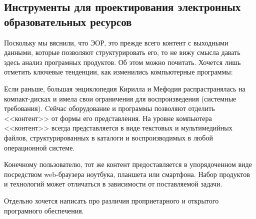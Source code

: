\large
\newpage
\large
\subsection{Инструменты для проектирования электронных образовательных ресурсов}
Поскольку мы вяснили, что ЭОР, это прежде всего контент с выходными данными, которые позволяют структурировать его, то не вижу смысла давать здесь анализ програмных продуктов. Об этом можно почитать\cite{mahmutova19, larin}. Хочется лишь отметить ключевые тенденции, как изменились компьютерные программы: 

Если раньше, большая энциклопедия Кирилла и Мефодия распрастранялась на компакт-дисках и имела свои ограничения для воспроизведения (системные требования). Cейчас оборудование и программы позволяют отделить <<контент>> от формы его представления. На уровне компьютера <<контент>> всегда представляется в виде текстовых и мультимедийных файлов, структурированных в каталоги и воспроизводимых в любой операционной системе. 

Конечному пользователю, тот же контент предоставляется в упорядоченном виде посредством 
web-браузера ноутбука, планшета или смартфона. Набор продуктов и технологий может отличаться в зависимости от поставляемой задачи. 

Отдельно хочется написать про различия проприетарного и открытого програмного обеспечения.

